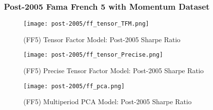 \subsubsection{Post-2005 Fama French 5 with Momentum Dataset}

\begin{figure}[H]
    \centering
    \texttt{[image: post-2005/ff\_tensor\_TFM.png]}
    \caption{(FF5) Tensor Factor Model: Post-2005 Sharpe Ratio}\label{fig:ff-post-2005-tfm}
\end{figure}

\begin{figure}[H]
    \centering
    \texttt{[image: post-2005/ff\_tensor\_Precise.png]}
    \caption{(FF5) Precise Tensor Factor Model: Post-2005 Sharpe Ratio}\label{fig:ff-post-2005-precise}
\end{figure}


\begin{figure}[H]
    \centering
    \texttt{[image: post-2005/ff\_pca.png]}
    \caption{(FF5) Multiperiod PCA Model: Post-2005 Sharpe Ratio}\label{fig:ff-post-2005-pca}
\end{figure}
